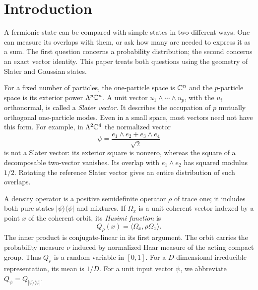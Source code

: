 \section{Introduction}
\label{sec:introduction}

A fermionic state can be compared with simple states in two different ways.
One can measure its overlaps with them, or ask how many are needed to express
it as a sum. The first question concerns a probability distribution; the
second concerns an exact vector identity. This paper treats both questions
using the geometry of Slater and Gaussian states.

For a fixed number of particles, the one-particle space is $\mathbb C^n$ and the
$p$-particle space is its exterior power $\Lambda^p\mathbb C^n$. A unit vector
$u_1\wedge\cdots\wedge u_p$, with the $u_i$ orthonormal, is called a
\emph{Slater vector}. It describes the occupation of $p$ mutually orthogonal
one-particle modes. Even in a small space, most vectors need not have this
form. For example, in $\Lambda^2\mathbb C^4$ the normalized vector
\begin{equation}\label{intro:two-particle}
 \psi=\frac{e_1\wedge e_2+e_3\wedge e_4}{\sqrt2}
\end{equation}
is not a Slater vector: its exterior square is nonzero, whereas the square
of a decomposable two-vector vanishes. Its overlap with $e_1\wedge e_2$ has
squared modulus $1/2$. Rotating the reference Slater vector gives an entire
distribution of such overlaps.

A density operator is a positive semidefinite operator $\rho$ of trace one;
it includes both pure states $|\psi\rangle\langle\psi|$ and mixtures. If
$\Omega_x$ is a unit coherent vector indexed by a point $x$ of the coherent
orbit, its \emph{Husimi function} is
\[
 Q_\rho(x)=\langle\Omega_x,\rho\Omega_x\rangle.
\]
The inner product is conjugate-linear in its first argument. The orbit
carries the probability measure $\nu$ induced by normalized Haar measure
of the acting compact group. Thus $Q_\rho$ is a random variable in $[0,1]$.
For a $D$-dimensional irreducible representation, its mean is $1/D$.
For a unit input vector $\psi$, we abbreviate
$Q_\psi=Q_{|\psi\rangle\langle\psi|}$.

